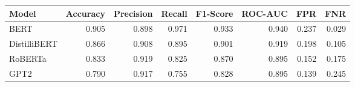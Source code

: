 \begin{tabular}{|l||r|r|r|r|r|r|r|}
\toprule
Model & \textbf{Accuracy} & \textbf{Precision} & Recall & \textbf{F1-Score} & \textbf{ROC-AUC} & \textbf{FPR} & FNR \\
\midrule \midrule
BERT & 0.905 & 0.898 & 0.971 & 0.933 & 0.940 & 0.237 & 0.029 \\
DistilliBERT & 0.866 & 0.908 & 0.895 & 0.901 & 0.919 & 0.198 & 0.105 \\
RoBERTa & 0.833 & 0.919 & 0.825 & 0.870 & 0.895 & 0.152 & 0.175 \\
GPT2 & 0.790 & 0.917 & 0.755 & 0.828 & 0.895 & 0.139 & 0.245 \\
\bottomrule
\end{tabular}
